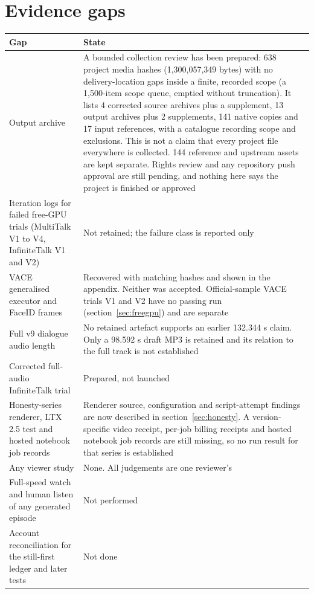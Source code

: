 \documentclass[11pt,a4paper]{article}
\begin{document}
\section{Evidence gaps}
\label{sec:gaps}
\begin{longtable}{@{}P{5.6cm}P{9.9cm}@{}}
\toprule \textbf{Gap} & \textbf{State}\\ \midrule\endhead
Output archive & A bounded collection review has been prepared: 638 project media hashes (1,300,057,349 bytes) with no delivery-location gaps inside a finite, recorded scope (a 1,500-item scope queue, emptied without truncation). It lists 4 corrected source archives plus a supplement, 13 output archives plus 2 supplements, 141 native copies and 17 input references, with a catalogue recording scope and exclusions. This is not a claim that every project file everywhere is collected. 144 reference and upstream assets are kept separate. Rights review and any repository push approval are still pending, and nothing here says the project is finished or approved\\
Iteration logs for failed free-GPU trials (MultiTalk V1 to V4, InfiniteTalk V1 and V2) & Not retained; the failure class is reported only\\
VACE generalised executor and FaceID frames & Recovered with matching hashes and shown in the appendix. Neither was accepted. Official-sample VACE trials V1 and V2 have no passing run (section~\ref{sec:freegpu}) and are separate\\
Full v9 dialogue audio length & No retained artefact supports an earlier 132.344 s claim. Only a 98.592 s draft MP3 is retained and its relation to the full track is not established\\
Corrected full-audio InfiniteTalk trial & Prepared, not launched\\
Honesty-series renderer, LTX 2.5 test and hosted notebook job records & Renderer source, configuration and script-attempt findings are now described in section~\ref{sec:honesty}. A version-specific video receipt, per-job billing receipts and hosted notebook job records are still missing, so no run result for that series is established\\
Any viewer study & None. All judgements are one reviewer's\\
Full-speed watch and human listen of any generated episode & Not performed\\
Account reconciliation for the still-first ledger and later tests & Not done\\
\bottomrule
\end{longtable}
\end{document}
